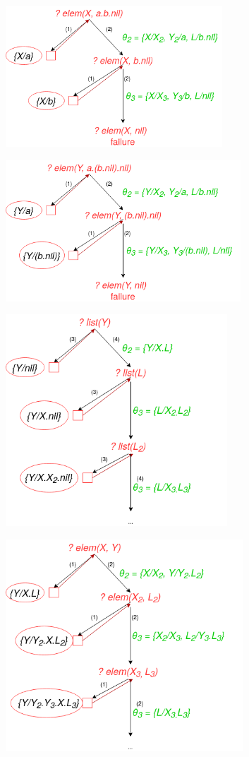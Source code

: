 \documentclass[11pt]{article}
\begin{document}
\begin{center}
\includegraphics[height=200px]{./d1.png}
\end{center}
\begin{center}
\includegraphics[height=200px]{./d2.png}
\end{center}
\begin{center}
\includegraphics[height=300px]{./d3.png}
\end{center}
\begin{center}
\includegraphics[height=300px]{./d4.png}
\end{center}
\end{document}
